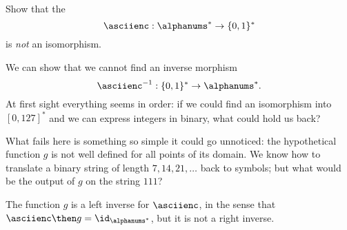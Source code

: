 \begin{exercise}
    Show that the \whomo
    \begin{equation*}
        \label{eq:ascii-to-bin}
        \asciienc: \alphanums^* \to \{0,1\}^*
    \end{equation*}
    is \emph{not} an isomorphism.
\end{exercise}
\begin{solution}
    We can show that we cannot find an inverse morphism
    \begin{equation}
        \label{eq:bin-to-ascii}
        \asciienc^{-1}:  \{0,1\}^* \to \alphanums^*.
    \end{equation}
    At first sight everything seems in order: if we could find an isomorphism into $[0,127]^*$ and we can express integers in binary, what could hold us back?

    What fails here is something so simple it could go unnoticed: the hypothetical function $g$ is not well defined for all points of its domain.
    We know how to translate a binary string of length $7,14,21,\dots$ back to symbols; but what would be the output of $g$ on the string $111$?

    The function $g$ is a left inverse for $\asciienc$, in the sense that
    $\asciienc\then g = \id_{\alphanums^*}$, but it is not a right inverse.

\end{solution}

